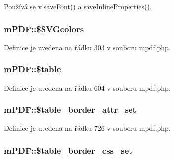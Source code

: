 Používá se v save\-Font() a save\-Inline\-Properties().

\hypertarget{classm_p_d_f_a75b4140ccbc8b1f5d821f5cd6a8f2729}{
\subsubsection[{\$\-S\-V\-Gcolors}]{\setlength{\rightskip}{0pt plus 5cm}m\-P\-D\-F\-::\$\-S\-V\-Gcolors}}\label{classm_p_d_f_a75b4140ccbc8b1f5d821f5cd6a8f2729}


Definice je uvedena na řádku 303 v souboru mpdf.\-php.

\hypertarget{classm_p_d_f_aa8149f0a8d1840150c8e994c60fda5e8}{
\subsubsection[{\$table}]{\setlength{\rightskip}{0pt plus 5cm}m\-P\-D\-F\-::\$table}}\label{classm_p_d_f_aa8149f0a8d1840150c8e994c60fda5e8}


Definice je uvedena na řádku 604 v souboru mpdf.\-php.

\hypertarget{classm_p_d_f_abb90edf22f4bdfa34c5fdf3a291e907a}{
\subsubsection[{\$table\-\_\-border\-\_\-attr\-\_\-set}]{\setlength{\rightskip}{0pt plus 5cm}m\-P\-D\-F\-::\$table\-\_\-border\-\_\-attr\-\_\-set}}\label{classm_p_d_f_abb90edf22f4bdfa34c5fdf3a291e907a}


Definice je uvedena na řádku 726 v souboru mpdf.\-php.

\hypertarget{classm_p_d_f_a672eb78627946caac7a72bf50d03c9b9}{
\subsubsection[{\$table\-\_\-border\-\_\-css\-\_\-set}]{\setlength{\rightskip}{0pt plus 5cm}m\-P\-D\-F\-::\$table\-\_\-border\-\_\-css\-\_\-set}}\label{classm_p_d_f_a672eb78627946caac7a72bf50d03c9b9}


